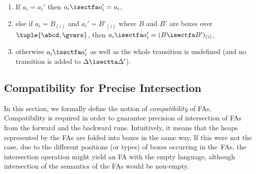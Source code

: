     \begin{enumerate}
		\item If $a_i = a_i'$ then $a_i \isectfa a_i' = a_i$,  
      \item else if $a_i = B_{(i)}$ and $a_i' = B'_{(i)}$ where $B$ and $B'$ are boxes over $\tuple{\abcd,\gvars}$, 
				then $a_i\isectfa a_i' = (B\isectfa B')_{(i)}$,
		\item otherwise $a_i \isectfa a_i'$ as well as the whole transition is undefined (and no transition is added to $\Delta \isectta \Delta'$). 
    \end{enumerate}

\subsection{Compatibility for Precise Intersection}\label{sec:compatibility}

In this section, we formally define the notion of \emph{compatibility} of FAs.
Compatibility is required in order to guarantee precision of intersection of FAs
from the forward and the backward runs.
Intuitively, it means that the heaps represented by the FAs are folded into
boxes in the same way.
If this were not the case, due to the different positions (or types) of boxes
occurring in the~FAs, the intersection operation might yield an FA with the
empty language, although intersection of the semantics of the FAs would be non-empty.

